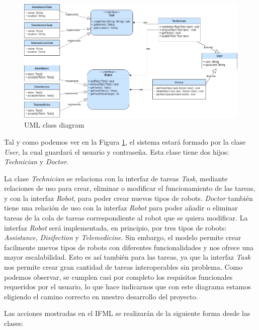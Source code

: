 \begin{figure}[H]
	\centering
	\includegraphics[width=1\textwidth]{images/DiagramaClasesWeb.drawio.png}
	\caption{UML class diagram}
	\label{fig:UMLModel}
\end{figure}
 Tal y como podemos ver en la Figura \ref{fig:UMLModel}, el sistema estará formado por la clase \textit{User}, la cual guardará el usuario y contraseña. Esta clase tiene dos hijos: \textit{Technician} y \textit{Doctor}.
 
 La clase \textit{Technician} se relaciona con la interfaz de tareas \textit{Task}, mediante relaciones de uso para crear, eliminar o modificar el funcionamiento de las tareas, y con la interfaz \textit{Robot}, para poder crear nuevos tipos de robots. \textit{Doctor} también tiene una relación de uso con la interfaz \textit{Robot} para poder añadir o eliminar tareas de la cola de tareas correspondiente al robot que se quiera modificar. La interfaz \textit{Robot} será implementada, en principio, por tres tipos de robots: \textit{Assistance}, \textit{Disifection} y \textit{Telemedicine}. Sin embargo, el modelo permite crear facilmente nuevos tipos de robots con diferentes funcionalidades y nos ofrece una mayor escalabilidad. Esto es así también para las tareas, ya que la interfaz \textit{Task} nos permite crear gran cantidad de tareas interoperables sin problema. Como podemos observar, se cumplen casi por completo los requisitos funcionales requeridos por el usuario, lo que hace indicarnos que con este diagrama estamos eligiendo el camino correcto en nuestro desarrollo del proyecto. 
 
Las acciones mostradas en el IFML se realizarán de la siguiente forma desde las clases:

